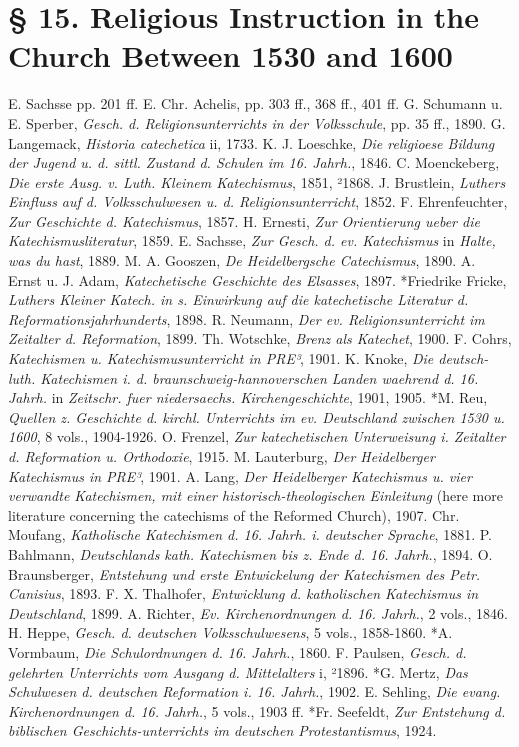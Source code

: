 \section[§ 15. Religious Instruction, 1530–1600]{§ 15. Religious Instruction in the Church Between 1530 and 1600}

E. Sachsse pp. 201 ff. E. Chr. Achelis, pp. 303 ff., 368 ff., 401 ff. G. Schumann u. E. Sperber, \emph{Gesch. d. Religionsunterrichts in der Volksschule}, pp. 35 ff., 1890. G. Langemack, \emph{Historia catechetica} ii, 1733. K. J. Loeschke, \emph{Die religioese Bildung der Jugend u. d. sittl. Zustand d. Schulen im 16. Jahrh.}, 1846. C. Moenckeberg, \emph{Die erste Ausg. v. Luth. Kleinem Katechismus}, 1851, ²1868. J. Brustlein, \emph{Luthers Einfluss auf d. Volksschulwesen u. d. Religionsunterricht}, 1852. F. Ehrenfeuchter, \emph{Zur Geschichte d. Katechismus}, 1857. H. Ernesti, \emph{Zur Orientierung ueber die Katechismusliteratur}, 1859. E. Sachsse, \emph{Zur Gesch. d. ev. Katechismus} in \emph{Halte, was du hast}, 1889. M. A. Gooszen, \emph{De Heidelbergsche Catechismus}, 1890. A. Ernst u. J. Adam, \emph{Katechetische Geschichte des Elsasses}, 1897. *Friedrike Fricke, \emph{Luthers Kleiner Katech. in s. Einwirkung auf die katechetische Literatur d. Reformationsjahrhunderts}, 1898. R. Neumann, \emph{Der ev. Religionsunterricht im Zeitalter d. Reformation}, 1899. Th. Wotschke, \emph{Brenz als Katechet}, 1900. F. Cohrs, \emph{Katechismen u. Katechismusunterricht in PRE³}, 1901. K. Knoke, \emph{Die deutsch-luth. Katechismen i. d. braunschweig-hannoverschen Landen waehrend d. 16. Jahrh.} in \emph{Zeitschr. fuer niedersaechs. Kirchengeschichte}, 1901, 1905. *M. Reu, \emph{Quellen z. Geschichte d. kirchl. Unterrichts im ev. Deutschland zwischen 1530 u. 1600}, 8 vols., 1904-1926. O. Frenzel, \emph{Zur katechetischen Unterweisung i. Zeitalter d. Reformation u. Orthodoxie}, 1915. M. Lauterburg, \emph{Der Heidelberger Katechismus in PRE³}, 1901. A. Lang, \emph{Der Heidelberger Katechismus u. vier verwandte Katechismen, mit einer historisch-theologischen Einleitung} (here more literature concerning the catechisms of the Reformed Church), 1907. Chr. Moufang, \emph{Katholische Katechismen d. 16. Jahrh. i. deutscher Sprache}, 1881. P. Bahlmann, \emph{Deutschlands kath. Katechismen bis z. Ende d. 16. Jahrh.}, 1894. O. Braunsberger, \emph{Entstehung und erste Entwickelung der Katechismen des Petr. Canisius}, 1893. F. X. Thalhofer, \emph{Entwicklung d. katholischen Katechismus in Deutschland}, 1899. A. Richter, \emph{Ev. Kirchenordnungen d. 16. Jahrh.}, 2 vols., 1846. H. Heppe, \emph{Gesch. d. deutschen Volksschulwesens}, 5 vols., 1858-1860. *A. Vormbaum, \emph{Die Schulordnungen d. 16. Jahrh.}, 1860. F. Paulsen, \emph{Gesch. d. gelehrten Unterrichts vom Ausgang d. Mittelalters}
 i, ²1896. *G. Mertz, \emph{Das Schulwesen d. deutschen Reformation i. 16. Jahrh.}, 1902. E. Sehling, \emph{Die evang. Kirchenordnungen d. 16. Jahrh.}, 5 vols., 1903 ff. *Fr. Seefeldt, \emph{Zur Entstehung d. biblischen Geschichts-unterrichts im deutschen Protestantismus}, 1924.

